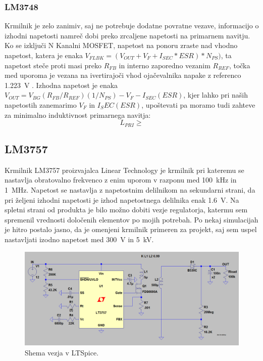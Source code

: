 \documentclass[a4paper,twoside,openright,12pt,slovene]{book}
\begin{document}
	\subsubsection{LM3748} \label{LM3748}
Krmilnik je zelo zanimiv, saj ne potrebuje dodatne povratne vezave, informacijo o izhodni napetosti namreč dobi preko zrcaljene napetosti na primarnem navitju. Ko se izključi N Kanalni MOSFET, napetost na ponoru zraste nad vhodno napetost, katera je enaka \(V_{FLBK} = (V_{OUT} + V_F + I_{SEC} * ESR) * N_{PS}) \), ta napetost steče proti masi preko \(R_{FB}\) in interno zaporedno vezanim \(R_{REF}\), točka med uporoma je vezana na ivertirajoči vhod ojačevalnika napake z referenco \SI{1.223}{\volt} \cite{analog:LT3748}. Izhodna napetost je enaka \(V_{OUT} = V_{BG}(R_{FB} / R_{REF})(1 / N_{PS}) - V_F - I_{SEC} (ESR)\), kjer lahko pri naših napetostih zanemarimo \(V_F\) in \(I_SEC (ESR)\), upoštevati pa moramo tudi zahteve za minimalno induktivnost primarnega navitja:
\[L_{PRI} \geq \]

	\subsection{LM3757} \label{LM3757}
Krmilnik LM3757 proizvajalca Linear Technology je krmilnik pri kateremu se nastavlja obratovalno frekvenco z enim uporom v razponu med \SI{100} {\kilo\hertz} in \SI{1} {\mega\hertz}. Napetost se nastavlja z napetostnim delilnikom na sekundarni strani, da pri željeni izhodni napetosti je izhod napetostnega delilnika enak \SI{1.6} {\volt}. Na spletni strani od produkta je bilo možno dobiti vezje regulatorja, katermu sem spremenil vrednosti določenih elementov po mojih potrebah. Po nekaj simulacijah je hitro postalo jasno, da je omenjeni krmilnik primeren za projekt, saj sem uspel nastavljati izodno napetost med \SI{300}{\volt} in \SI{5}{\kilo\volt}. 

    \begin{figure}[H]
        \centering
        \includegraphics[width=1\columnwidth]{Slike/Simulacije/LM3757spice.png}
        \caption{\label{LM3757spice} Shema vezja v LTSpice.}
    \end{figure}
    
\end{document}
